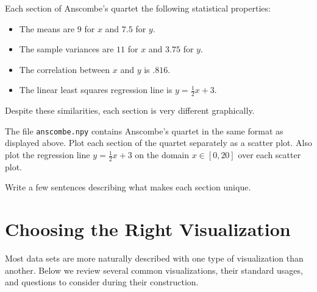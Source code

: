 Each section of Anscombe's quartet the following statistical properties:
\begin{itemize}
\setlength\itemsep{0em}
\item The means are $9$ for $x$ and $7.5$ for $y$.
\item The sample variances are $11$ for $x$ and $3.75$ for $y$.
\item The correlation between $x$ and $y$ is $.816$.
\item The linear least squares regression line is $y=\frac{1}{2}x+3$.
\end{itemize}

Despite these similarities, each section is very different graphically.

\begin{problem} %
\label{prob:anscombe}
The file \texttt{anscombe.npy} contains Anscombe's quartet in the same format as displayed above.
Plot each section of the quartet separately as a scatter plot.
Also plot the regression line $y = \frac{1}{2}x + 3$ on the domain $x\in[0,20]$ over each scatter plot.

Write a few sentences describing what makes each section unique.
\end{problem}

\section*{Choosing the Right Visualization} %

Most data sets are more naturally described with one type of visualization than another.
Below we review several common visualizations, their standard usages, and questions to consider during their construction.

